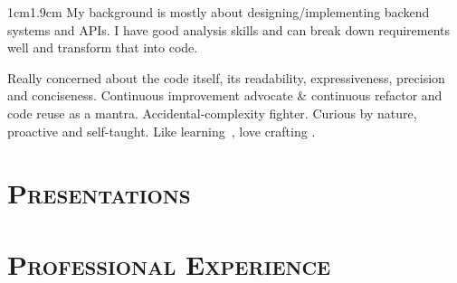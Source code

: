 \documentclass[10pt,a4paper,colorlinks=true]{moderncv} %
\begin{document}
\vspace{8pt}
\begin{adjustwidth}{1cm}{1.9cm}
  \setlength{\parskip}{6pt}
  My background is mostly about designing/implementing backend systems and APIs. I have good analysis skills and can break down requirements well and transform that into code.

  Really concerned about the code itself, its readability, expressiveness, precision and conciseness. Continuous improvement advocate \& continuous refactor and code reuse as a mantra. Accidental-complexity fighter. Curious by nature, proactive and self-taught. Like learning~, love crafting .
\end{adjustwidth}
\vspace{1ex}

\section{\textsc{Presentations}}


\vspace{-3pt}
\vspace{-4pt}


\section{\textsc{Professional Experience}}
\end{document}
